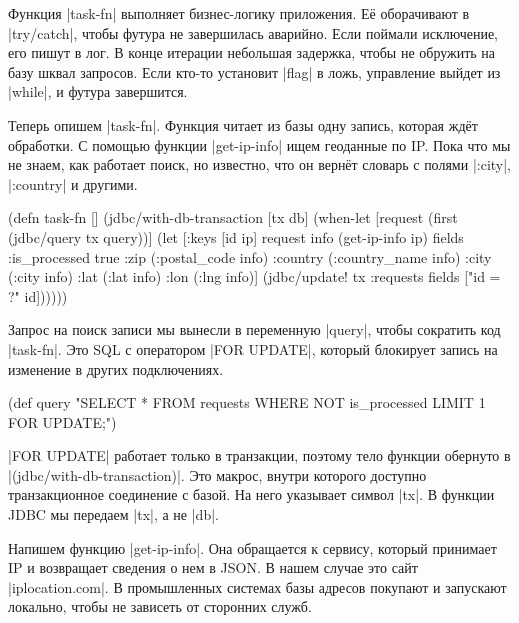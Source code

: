Функция \spverb|task-fn| выполняет бизнес-логику приложения. Е\"{е} оборачивают в
\spverb|try/catch|, чтобы футура не завершилась аварийно. Если поймали
исключение, его пишут в лог. В конце итерации небольшая задержка, чтобы не
обружить на базу шквал запросов. Если кто-то установит \spverb|flag| в ложь,
управление выйдет из \spverb|while|, и футура завершится.

Теперь опишем \spverb|task-fn|. Функция читает из базы одну запись, которая
жд\"{е}т обработки. С помощью функции \spverb|get-ip-info| ищем геоданные по
IP. Пока что мы не знаем, как работает поиск, но известно, что он верн\"{е}т словарь
с полями \spverb|:city|, \spverb|:country| и другими.

\begin{english}
  \begin{clojure}
(defn task-fn []
  (jdbc/with-db-transaction [tx db]
    (when-let [request (first (jdbc/query tx query))]
      (let [{:keys [id ip]} request
            info   (get-ip-info ip)
            fields {:is_processed true
                    :zip (:postal_code info)
                    :country (:country_name info)
                    :city (:city info)
                    :lat (:lat info)
                    :lon (:lng info)}]
        (jdbc/update! tx :requests
                      fields
                      ["id = ?" id])))))
  \end{clojure}
\end{english}

Запрос на поиск записи мы вынесли в переменную \spverb|query|, чтобы сократить
код \spverb|task-fn|. Это SQL с оператором \spverb|FOR UPDATE|, который
блокирует запись на изменение в других подключениях.

\begin{english}
  \begin{clojure}
(def query
  "SELECT * FROM requests
   WHERE NOT is_processed
   LIMIT 1 FOR UPDATE;")
  \end{clojure}
\end{english}

\spverb|FOR UPDATE| работает только в транзакции, поэтому тело функции обернуто
в \spverb|(jdbc/with-db-transaction)|. Это макрос, внутри которого доступно
транзакционное соединение с базой. На него указывает символ \spverb|tx|. В
функции JDBC мы передаем \spverb|tx|, а не \spverb|db|.

Напишем функцию \spverb|get-ip-info|. Она обращается к сервису, который
принимает IP и возвращает сведения о нем в JSON. В нашем случае это сайт
\spverb|iplocation.com|. В промышленных системах базы адресов покупают и
запускают локально, чтобы не зависеть от сторонних служб.

